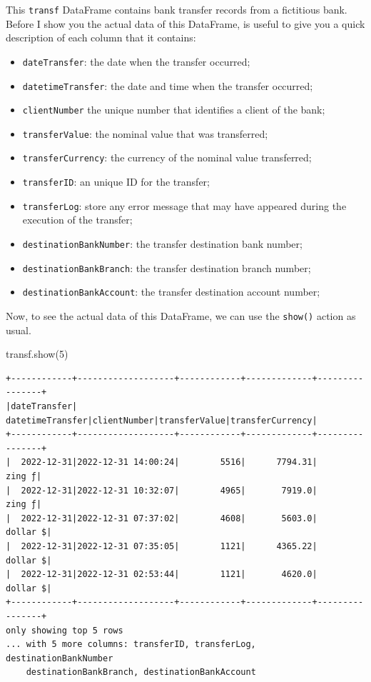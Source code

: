 \documentclass[
  11pt,
  letterpaper,
  DIV=11,
  numbers=noendperiod]{scrreprt}
\newenvironment{Shaded}{\begin{snugshade}}{\end{snugshade}}
\newcommand{\DecValTok}[1]{\textcolor[rgb]{0.68,0.00,0.00}{#1}}
\newcommand{\NormalTok}[1]{\textcolor[rgb]{0.00,0.23,0.31}{#1}}
\providecommand{\tightlist}{%
  \setlength{\itemsep}{0pt}\setlength{\parskip}{0pt}}\usepackage{longtable,booktabs,array}
\begin{document}
This \texttt{transf} DataFrame contains bank transfer records from a
fictitious bank. Before I show you the actual data of this DataFrame, is
useful to give you a quick description of each column that it contains:

\begin{itemize}
\tightlist
\item
  \texttt{dateTransfer}: the date when the transfer occurred;
\item
  \texttt{datetimeTransfer}: the date and time when the transfer
  occurred;
\item
  \texttt{clientNumber} the unique number that identifies a client of
  the bank;
\item
  \texttt{transferValue}: the nominal value that was transferred;
\item
  \texttt{transferCurrency}: the currency of the nominal value
  transferred;
\item
  \texttt{transferID}: an unique ID for the transfer;
\item
  \texttt{transferLog}: store any error message that may have appeared
  during the execution of the transfer;
\item
  \texttt{destinationBankNumber}: the transfer destination bank number;
\item
  \texttt{destinationBankBranch}: the transfer destination branch
  number;
\item
  \texttt{destinationBankAccount}: the transfer destination account
  number;
\end{itemize}

Now, to see the actual data of this DataFrame, we can use the
\texttt{show()} action as usual.

\begin{Shaded}
\begin{Highlighting}[]
\NormalTok{transf.show(}\DecValTok{5}\NormalTok{)}
\end{Highlighting}
\end{Shaded}

\begin{verbatim}
+------------+-------------------+------------+-------------+----------------+
|dateTransfer|   datetimeTransfer|clientNumber|transferValue|transferCurrency|
+------------+-------------------+------------+-------------+----------------+
|  2022-12-31|2022-12-31 14:00:24|        5516|      7794.31|          zing ƒ|
|  2022-12-31|2022-12-31 10:32:07|        4965|       7919.0|          zing ƒ|
|  2022-12-31|2022-12-31 07:37:02|        4608|       5603.0|        dollar $|
|  2022-12-31|2022-12-31 07:35:05|        1121|      4365.22|        dollar $|
|  2022-12-31|2022-12-31 02:53:44|        1121|       4620.0|        dollar $|
+------------+-------------------+------------+-------------+----------------+
only showing top 5 rows
... with 5 more columns: transferID, transferLog, destinationBankNumber
    destinationBankBranch, destinationBankAccount
\end{verbatim}
\end{document}
